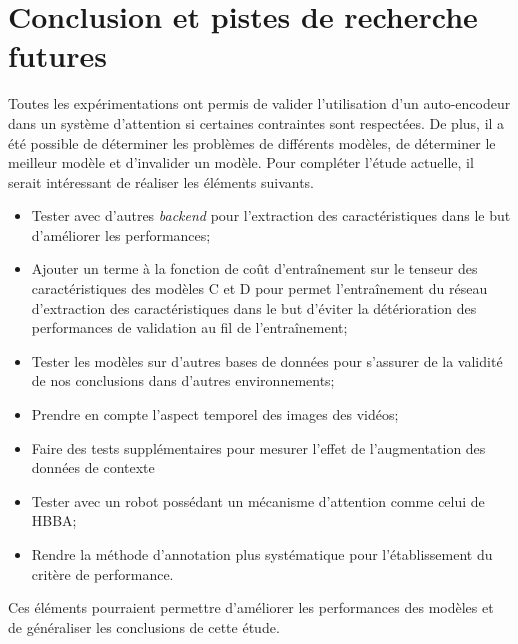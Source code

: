 \section{Conclusion et pistes de recherche futures}
    Toutes les expérimentations ont permis de valider l'utilisation d'un auto-encodeur dans un système d'attention si certaines contraintes sont respectées. De plus, il a été possible de déterminer les problèmes de différents modèles, de déterminer le meilleur modèle et d'invalider un modèle. Pour compléter l'étude actuelle, il serait intéressant de réaliser les éléments suivants.

    \begin{itemize}
        \item Tester avec d'autres \textit{backend} pour l'extraction des caractéristiques dans le but d'améliorer les performances;
        \item Ajouter un terme à la fonction de coût d'entraînement sur le tenseur des caractéristiques des modèles C et D  pour permet l'entraînement du réseau d'extraction des caractéristiques dans le but d'éviter la détérioration des performances de validation au fil de l'entraînement;
        \item Tester les modèles sur d'autres bases de données pour s'assurer de la validité de nos conclusions dans d'autres environnements;
        \item Prendre en compte l'aspect temporel des images des vidéos;
        \item Faire des tests supplémentaires pour mesurer l'effet de l'augmentation des données de contexte
        \item Tester avec un robot possédant un mécanisme d'attention comme celui de HBBA;
        \item Rendre la méthode d'annotation plus systématique pour l'établissement du critère de performance.
    \end{itemize}
    
    Ces éléments pourraient permettre d'améliorer les performances des modèles et de généraliser les conclusions de cette étude.